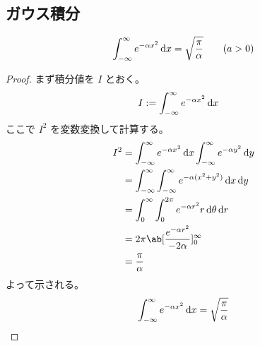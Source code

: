 \documentclass[uplatex,diffipdfmx,a4paper,11pt]{jlreq}
\begin{document}
\subsection{ガウス積分}
\begin{theorem}[Gauss 積分]
  \begin{align}
    \int_{-\infty}^{\infty} e^{-\alpha x^2}\dl{x} = \sqrt{\frac{\pi}{\alpha}} \qquad (\real a > 0)
  \end{align}
\end{theorem}
\begin{proof}
  まず積分値を $I$ とおく。
  \begin{align}
    I & := \int_{-\infty}^{\infty} e^{-\alpha x^2}\dl{x}
  \end{align}
  ここで $I^2$ を変数変換して計算する。
  \begin{align}
    I^2 & = \int_{-\infty}^{\infty} e^{-\alpha x^2}\dl{x}\int_{-\infty}^{\infty} e^{-\alpha y^2}\dl{y} \\
        & = \int_{-\infty}^{\infty}\int_{-\infty}^{\infty} e^{-\alpha(x^2 + y^2)}\dl{x}\dl{y}          \\
        & = \int_0^{\infty}\int_0^{2\pi}e^{-\alpha r^2}r\dl{\theta}\dl{r}                              \\
        & = 2\pi\ab[\frac{e^{-\alpha r^2}}{-2\alpha}]_0^{\infty}                                       \\
        & = \frac{\pi}{\alpha}
  \end{align}
  よって示される。
  \begin{align}
    \int_{-\infty}^{\infty} e^{-\alpha x^2}\dl{x} = \sqrt{\frac{\pi}{\alpha}}
  \end{align}
\end{proof}
\end{document}

